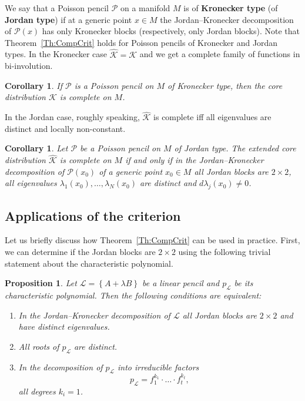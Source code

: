 \documentclass[12pt]{article}
\newtheorem{proposition}[lemma]{Proposition}
\newtheorem{corollary}[lemma]{Corollary}
\theoremstyle{definition}
\begin{document}
We say that a Poisson pencil $\mathcal{P}$ on a manifold $M$ is of \textbf{Kronecker type} (of \textbf{Jordan type}) if at a generic point $x \in M$ the Jordan--Kronecker decomposition of $\mathcal{P}(x)$ has only Kronecker blocks (respectively, only Jordan blocks). Note that Theorem~\ref{Th:CompCrit} holds for Poisson pencils of Kronecker and Jordan types. In the Kronecker case $\hat{\mathcal{K}} = \mathcal{K}$ and we get a complete family of functions in bi-involution. 

\begin{corollary} If $\mathcal{P}$ is a Poisson pencil on $M$ of Kronecker type, then the core distribution $\mathcal{K}$ is complete on $M$. \end{corollary}

In the Jordan case, roughly speaking, $\hat{\mathcal{K}}$ is complete iff all eigenvalues are distinct and locally non-constant. 

\begin{corollary}  Let $\mathcal{P}$ be a Poisson pencil on $M$ of Jordan type. The extended core distribution $\hat{\mathcal{K}}$ is complete on $M$ if and only if  in the Jordan--Kronecker decomposition of $\mathcal{P}(x_0)$ of a generic point $x_0 \in M$
all Jordan blocks are $2 \times 2$, all  eigenvalues $\lambda_1(x_0), \dots, \lambda_{N}(x_0)$ are distinct and $d \lambda_j(x_0) \not = 0$.
\end{corollary}

\subsection{Applications of the criterion}

 Let us briefly discuss how Theorem~\ref{Th:CompCrit} can be used in practice. First, we can determine if the Jordan blocks are $2\times 2$ using the following trivial statement about the characteristic polynomial.


\begin{proposition} Let $\mathcal{L} = \left\{A + \lambda B\right\}$ be a linear pencil and $p_{\mathcal{L}}$ be its characteristic polynomial. Then the following conditions are equivalent:

\begin{enumerate}

\item In the Jordan--Kronecker decomposition of $\mathcal{L}$ all Jordan blocks are $2 \times 2$ and have distinct eigenvalues. 

\item All roots of $p_{\mathcal{L}}$ are distinct.

\item In the decomposition of $p_{\mathcal{L}}$ into irreducible factors \[p_{\mathcal{L}} = f_1^{k_1}  \cdot \dots \cdot f_t^{k_t},  \] all degrees $k_i = 1$.

\end{enumerate}

\end{proposition}
\end{document}
